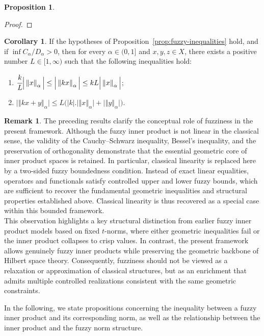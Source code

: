 \documentclass[preprint,12pt]{elsarticle}
\newcommand{\norm}[1]{\left\Vert#1\right\Vert}
\newcommand{\abs}[1]{\left\vert#1\right\vert}
\theoremstyle{definition}
\newtheorem{remark}{Remark}[section]
\newtheorem{proposition}{Proposition}[section]
\newtheorem{corollary}[theorem]{Corollary}
\begin{document}
\begin{proposition}
\begin{proof}
		
	\end{proof}
	\begin{corollary}
		If the hypotheses of Proposition~\ref{prop:fuzzy-inequalities} hold, and if $\inf C_\alpha / D_\alpha > 0$, then for every $\alpha \in (0,1]$ and $x, y, z \in X$, there exists a positive number $L \in [1, \infty)$ such that the following inequalities hold:
		\begin{enumerate}
			\item \(\cfrac{k}{L}\Big\vert  \norm{x}_\alpha\Big\vert\leq\Big\vert \norm{kx}_\alpha\Big\vert\leq kL\Big\vert \norm{x}_\alpha\Big\vert  \);
			\item \(\Big\vert\norm{kx+y}_\alpha\Big\vert\leq L\bigg(\abs{k}.\Big\vert\norm{x}_\alpha \Big\vert+\Big\vert\norm{y}_\alpha \Big\vert\bigg) \).
		\end{enumerate}
	\end{corollary}
	\begin{remark}
		The preceding results clarify the conceptual role of fuzziness in the present framework. 
		Although the fuzzy inner product is not linear in the classical sense, the validity of the Cauchy--Schwarz inequality, Bessel’s inequality, and the preservation of orthogonality demonstrate that the essential geometric core of inner product spaces is retained. 
		In particular, classical linearity is replaced here by a two-sided fuzzy boundedness condition. 
		Instead of exact linear equalities, operators and functionals satisfy controlled upper and lower fuzzy bounds, which are sufficient to recover the fundamental geometric inequalities and structural properties established above. 
		Classical linearity is thus recovered as a special case within this bounded framework.\\
		This observation highlights a key structural distinction from earlier fuzzy inner product models based on fixed $t$-norms, where either geometric inequalities fail or the inner product collapses to crisp values. 
		In contrast, the present framework allows genuinely fuzzy inner products while preserving the geometric backbone of Hilbert space theory. 
		Consequently, fuzziness should not be viewed as a relaxation or approximation of classical structures, but as an enrichment that admits multiple controlled realizations consistent with the same geometric constraints.
	\end{remark}
	In the following, we state propositions concerning the inequality between a fuzzy inner product and its corresponding norm, as well as the relationship between the inner product and the fuzzy norm structure.
	
\end{proposition}
\end{document}
